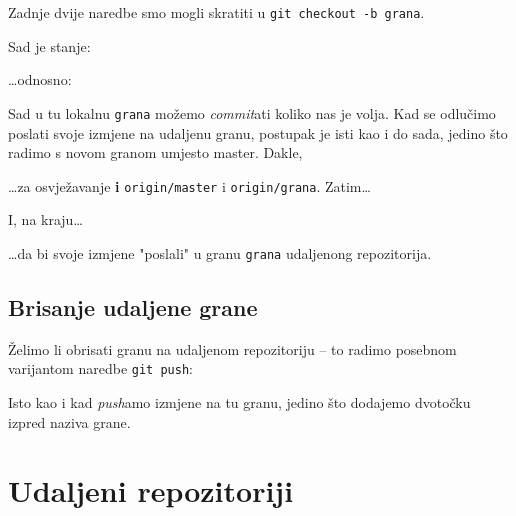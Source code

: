 
Zadnje dvije naredbe smo mogli skratiti u \verb+git checkout -b grana+.

Sad je stanje:



\dots{}odnosno:



Sad u tu lokalnu \verb+grana+ možemo \emph{commit}ati koliko nas je volja.
Kad se odlučimo poslati svoje izmjene na udaljenu granu, postupak je isti kao i do sada, jedino što radimo s novom granom umjesto master.
Dakle,


\dots{}za osvježavanje \textbf{i} \verb+origin/master+ i \verb+origin/grana+.
Zatim\dots


I, na kraju\dots


\dots{}da bi svoje izmjene "poslali" u granu \verb+grana+ udaljenong repozitorija.

\subsection*{Brisanje udaljene grane}

Želimo li obrisati granu na udaljenom repozitoriju -- to radimo posebnom varijantom naredbe \verb+git push+:


Isto kao i kad \emph{push}amo izmjene na tu granu, jedino što dodajemo dvotočku izpred naziva grane.

%

\section*{Udaljeni repozitoriji}

